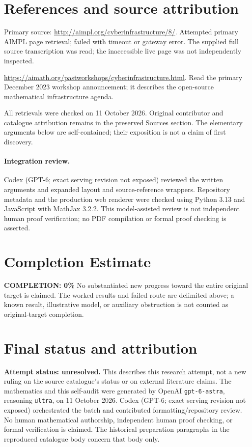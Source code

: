\documentclass[11pt]{article}
\begin{document}
\section{References and source attribution}
Primary source: \url{http://aimpl.org/cyberinfrastructure/8/}. Attempted primary AIMPL page retrieval; failed with timeout or gateway error. The supplied full source transcription was read; the inaccessible live page was not independently inspected.

\url{https://aimath.org/pastworkshops/cyberinfrastructure.html}. Read the primary December 2023 workshop announcement; it describes the open-source mathematical infrastructure agenda.

All retrievals were checked on 11 October 2026. Original contributor and catalogue attribution remains in the preserved Sources section. The elementary arguments below are self-contained; their exposition is not a claim of first discovery.


\paragraph{Integration review.} Codex (GPT-6; exact serving revision not exposed) reviewed the written arguments and expanded layout and source-reference wrappers. Repository metadata and the production web renderer were checked using Python 3.13 and JavaScript with MathJax 3.2.2. This model-assisted review is not independent human proof verification; no PDF compilation or formal proof checking is asserted.

\section{Completion Estimate}
\noindent\textbf{COMPLETION: 0\%}
No substantiated new progress toward the entire original target is claimed. The worked results and failed route are delimited above; a known result, illustrative model, or auxiliary obstruction is not counted as original-target completion.

\section{Final status and attribution}
\textbf{Attempt status: unresolved.} This describes this research attempt, not a new ruling on the source catalogue's status or on external literature claims.
The mathematics and this self-audit were generated by OpenAI \texttt{gpt-6-astra}, reasoning \texttt{ultra}, on 11 October 2026. Codex (GPT-6; exact serving revision not exposed) orchestrated the batch and contributed formatting/repository review. No human mathematical authorship, independent human proof checking, or formal verification is claimed. The historical preparation paragraphs in the reproduced catalogue body concern that body only.
\end{document}
